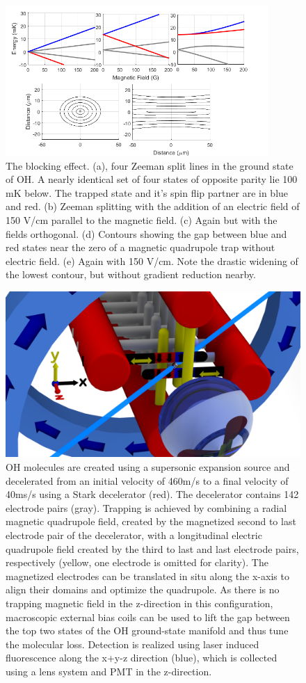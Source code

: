\documentclass[%
 reprint,
 amsmath,amssymb,
 aps,
prl,
]{revtex4-1}
\begin{document}
\begin{figure}
\includegraphics[width=100mm]{blocking.png}%
\caption{
The blocking effect. (a), four Zeeman split lines in the ground state of OH. A nearly identical set of four states of opposite parity lie 100 mK below. The trapped state and it's spin flip partner are in blue and red. (b) Zeeman splitting with the addition of an electric field of 150 V/cm parallel to the magnetic field. (c) Again but with the fields orthogonal. (d) Contours showing the gap between blue and red states near the zero of a magnetic quadrupole trap without electric field. (e) Again with 150 V/cm. Note the drastic widening of the lowest contour, but without gradient reduction nearby.
\label{fig:blocking}}
\end{figure}

\begin{figure}
\includegraphics[width=180mm]{blue-red-yellow-v2_CAD.png}%
\caption{
OH molecules are created using a supersonic expansion source and decelerated from an initial velocity of 460m/s to a final velocity of 40ms/s using a Stark decelerator (red). The decelerator contains 142 electrode pairs (gray). Trapping is achieved by combining a radial magnetic quadrupole field, created by the magnetized second to last electrode pair of the decelerator, with a longitudinal electric quadrupole field created by the third to last and last electrode pairs, respectively (yellow, one electrode is omitted for clarity). The magnetized electrodes can be translated in situ along the x-axis to align their domains and optimize the quadrupole. As there is no trapping magnetic field in the z-direction in this configuration, macroscopic external bias coils can be used to lift the gap between the top two states of the OH ground-state manifold and thus tune the molecular loss. Detection is realized using laser induced fluorescence along the x+y-z direction (blue), which is collected using a lens system and PMT in the z-direction.
\label{fig:CAD}}
\end{figure}
\end{document}
